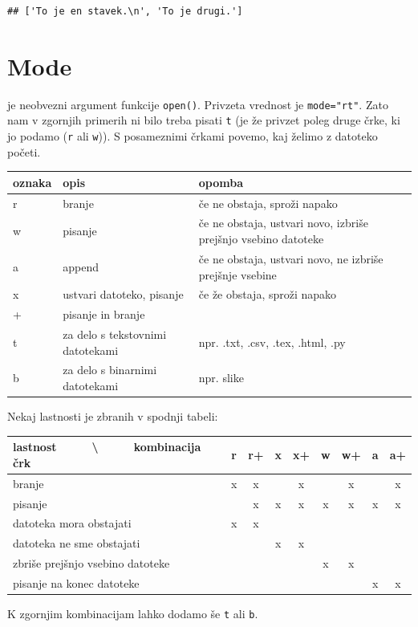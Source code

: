\documentclass[
]{book}
\begin{document}
\begin{verbatim}
## ['To je en stavek.\n', 'To je drugi.']
\end{verbatim}

\hypertarget{mode}{%
\section{Mode}\label{mode}}

je neobvezni argument funkcije \texttt{open()}. Privzeta vrednost je \texttt{mode="rt"}. Zato
nam v zgornjih primerih ni bilo treba pisati \texttt{t} (je že privzet poleg druge
črke, ki jo podamo (\texttt{r} ali \texttt{w})). S posameznimi črkami povemo, kaj želimo z
datoteko početi.

\begin{longtable}[]{@{}lll@{}}
\toprule
oznaka & opis & opomba \\
\midrule
\endhead
r & branje & če ne obstaja, sproži napako \\
w & pisanje & če ne obstaja, ustvari novo, izbriše prejšnjo vsebino datoteke \\
a & append & če ne obstaja, ustvari novo, ne izbriše prejšnje vsebine \\
x & ustvari datoteko, pisanje & če že obstaja, sproži napako \\
+ & pisanje in branje & \\
t & za delo s tekstovnimi datotekami & npr. .txt, .csv, .tex, .html, .py \\
b & za delo s binarnimi datotekami & npr. slike \\
\bottomrule
\end{longtable}

Nekaj lastnosti je zbranih v spodnji tabeli:

\begin{longtable}[]{@{}lcccccccc@{}}
\toprule
lastnost     \textbackslash{}     kombinacija črk & r & r+ & x & x+ & w & w+ & a & a+ \\
\midrule
\endhead
branje & x & x & & x & & x & & x \\
pisanje & & x & x & x & x & x & x & x \\
datoteka mora obstajati & x & x & & & & & & \\
datoteka ne sme obstajati & & & x & x & & & & \\
zbriše prejšnjo vsebino datoteke & & & & & x & x & & \\
pisanje na konec datoteke & & & & & & & x & x \\
\bottomrule
\end{longtable}

K zgornjim kombinacijam lahko dodamo še \texttt{t} ali \texttt{b}.
\end{document}
